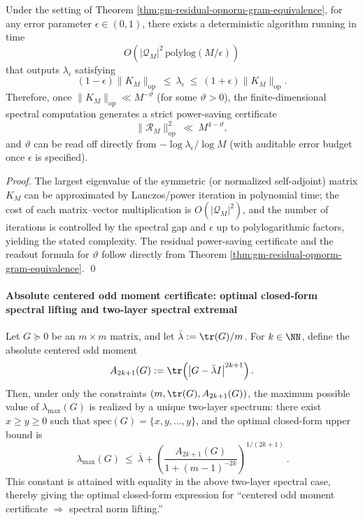 \begin{corollary}\label{cor:gm-KM-computable-vtheta}
Under the setting of Theorem \ref{thm:gm-residual-opnorm-gram-equivalence}, for any error parameter \(\epsilon\in(0,1)\), there exists a deterministic algorithm running in time
\[
O\!\left(|\mathcal{Q}_M|^{2}\,\mathrm{polylog}(M/\epsilon)\right)
\]
that outputs \(\lambda_\epsilon\) satisfying
\[
(1-\epsilon)\|K_M\|_{\mathrm{op}}\ \le\ \lambda_\epsilon\ \le\ (1+\epsilon)\|K_M\|_{\mathrm{op}}.
\]
Therefore, once \(\|K_M\|_{\mathrm{op}}\ll M^{-\vartheta}\) (for some \(\vartheta>0\)), the finite-dimensional spectral computation generates a strict power-saving certificate
\[
\|\mathcal{R}_M\|_{\mathrm{op}}^2\ \ll\ M^{4-\vartheta},
\]
and \(\vartheta\) can be read off directly from \(-\log\lambda_\epsilon/\log M\) (with auditable error budget once \(\epsilon\) is specified).
\end{corollary}

\begin{proof}
The largest eigenvalue of the symmetric (or normalized self-adjoint) matrix \(K_M\) can be approximated by Lanczos/power iteration in polynomial time; the cost of each matrix--vector multiplication is \(O(|\mathcal{Q}_M|^2)\), and the number of iterations is controlled by the spectral gap and \(\epsilon\) up to polylogarithmic factors, yielding the stated complexity.
The residual power-saving certificate and the readout formula for \(\vartheta\) follow directly from Theorem \ref{thm:gm-residual-opnorm-gram-equivalence}. \qed
\end{proof}

\paragraph{Absolute centered odd moment certificate: optimal closed-form spectral lifting and two-layer spectral extremal}
\begin{theorem}\label{thm:gm-abs-centered-odd-moment-extremal}
Let \(G\succeq 0\) be an \(m\times m\) matrix, and let \(\bar\lambda:=\tr(G)/m\).
For \(k\in\NN\), define the absolute centered odd moment
\[
A_{2k+1}(G):=\tr\!\left(\left|G-\bar\lambda I\right|^{2k+1}\right).
\]
Then, under only the constraints \((m,\tr(G),A_{2k+1}(G))\), the maximum possible value of \(\lambda_{\max}(G)\) is realized by a unique two-layer spectrum:
there exist \(x\ge y\ge 0\) such that \(\mathrm{spec}(G)=\{x,y,\dots,y\}\), and the optimal closed-form upper bound is
\[
\boxed{\
\lambda_{\max}(G)\ \le\ \bar\lambda+\left(\frac{A_{2k+1}(G)}{1+(m-1)^{-2k}}\right)^{\!1/(2k+1)}
\ }.
\]
This constant is attained with equality in the above two-layer spectral case, thereby giving the optimal closed-form expression for ``centered odd moment certificate \(\Rightarrow\) spectral norm lifting.''
\end{theorem}


